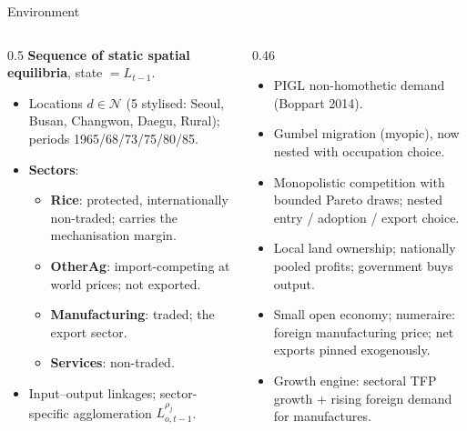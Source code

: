 \documentclass[10pt,aspectratio=169]{beamer}
\newcommand{\hl}[1]{\textcolor{mOrange}{#1}}
\begin{document}
\begin{frame}{Environment}
  \begin{columns}[T]
    \begin{column}{0.5\textwidth}
      \small
      \textbf{Sequence of static spatial equilibria}, state $=L_{t-1}$.\\[0.3em]
      \begin{itemize}
        \item Locations $d\in\mathcal N$ (5 stylised: Seoul, Busan, Changwon, Daegu,
              Rural); periods 1965/68/73/75/80/85.
        \item \textbf{Sectors}:
          \begin{itemize}\footnotesize
            \item \textbf{Rice}: protected, internationally non-traded; carries the
                  mechanisation margin.
            \item \textbf{OtherAg}: import-competing at world prices; not exported.
            \item \textbf{Manufacturing}: traded; the export sector.
            \item \textbf{Services}: non-traded.
          \end{itemize}
        \item Input--output linkages; sector-specific agglomeration $L_{o,t-1}^{\rho_j}$.
      \end{itemize}
    \end{column}
    \begin{column}{0.46\textwidth}
      \small
      \begin{itemize}
        \item PIGL non-homothetic demand (Boppart 2014).
        \item Gumbel migration (myopic), now \hl{nested} with occupation choice.
        \item Monopolistic competition with bounded Pareto draws; \hl{nested}
              entry / adoption / export choice.
        \item Local land ownership; nationally pooled profits; government buys output.
        \item Small open economy; numeraire: foreign manufacturing price;
              net exports \hl{pinned exogenously}.
        \item Growth engine: sectoral TFP growth + rising foreign demand for manufactures.
      \end{itemize}
    \end{column}
  \end{columns}
\end{frame}
\end{document}
